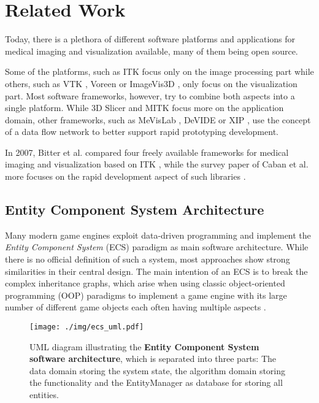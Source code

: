 \section{Related Work}
\label{sec:related-work}

Today, there is a plethora of different software platforms and applications for medical imaging and visualization available, many of them being open source.

Some of the platforms, such as ITK \cite{ITK} focus only on the image processing part while others, such as VTK \cite{VTK},  Voreen \cite{Voreen09} or ImageVis3D \cite{fogal2010tuvokimagevis3d}, only focus on the visualization part.
Most software frameworks, however, try to combine both aspects into a single platform.
While 3D Slicer \cite{3dslicer} and MITK \cite{wolf2005mitk} focus more on the application domain, other frameworks, such as MeVisLab \cite{ritter2011mevislab}, DeVIDE \cite{botha2008devide} or XIP \cite{xip}, use the concept of a data flow network to better support rapid prototyping development.

In 2007, Bitter et al. compared four freely available frameworks for medical imaging and visualization based on ITK \cite{bitter2007comparison}, while the survey paper of Caban et al. more focuses on the rapid development aspect of such libraries \cite{caban2007rapiddevelopment}.

\subsection{Entity Component System Architecture}

Many modern game engines exploit data-driven programming and implement the \emph{Entity Component System} (ECS) paradigm as main software architecture.
While there is no official definition of such a system, most approaches show strong similarities in their central design.
The main intention of an ECS is to break the complex inheritance graphs, which arise when using classic object-oriented programming (OOP) paradigms to implement a game engine with its large number of different game objects each often having multiple aspects \cite{bilas2002slides,mcshaffry2003game}. 

\begin{figure}[ht]
	\centering
	\texttt{[image: ./img/ecs\_uml.pdf]}
	\caption{
		UML diagram illustrating the \textbf{Entity Component System software architecture}, which is separated into three parts:
		The data domain storing the system state, the algorithm domain storing the functionality and the EntityManager as database for storing all entities.
	}
	\label{fig:ecs-uml}
\end{figure}

